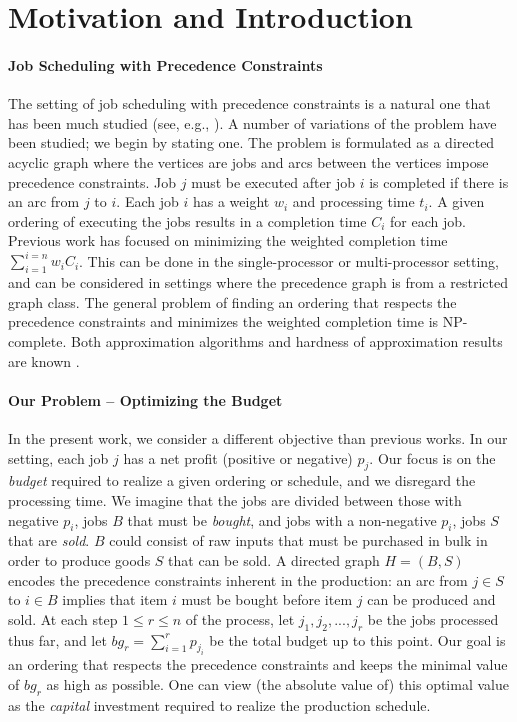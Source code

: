 \documentclass[letterpaper,11pt,abstracton]{scrartcl}
\begin{document}
\section{Motivation and Introduction}\label{sec:intro}

\paragraph{Job Scheduling with Precedence Constraints}
The setting of job scheduling with precedence constraints is a natural
one that has been much studied (see, e.g., \cite{CS05,MMS04}).  A number of
variations of the problem have been studied; we begin by stating one.
The problem is formulated as a directed acyclic graph where
the vertices are jobs and arcs between the vertices impose precedence
constraints.  Job $j$ must be executed after job $i$ is completed if
there is an arc from $j$ to $i$.  Each job $i$ has a weight $w_i$ and
processing time $t_i$.  A given ordering of executing the jobs results
in a completion time $C_i$ for each job.  Previous work has focused on
minimizing the weighted completion time $\sum_{i=1}^{i=n}w_iC_i$.
This can be done in the single-processor or multi-processor setting,
and can be considered in settings where the precedence graph is from
a restricted graph class.  The general problem of finding an ordering that
respects the precedence constraints and minimizes the weighted
completion time is NP-complete.  Both approximation algorithms and
hardness of approximation results are known \cite{AMMS11,AMS07,MMS04,woginger1}.



\paragraph{Our Problem -- Optimizing the Budget}
In the present work, we consider a different objective than previous
works.  In our setting, each job $j$ has a net profit (positive or
negative) $p_j$.  Our focus is on the \emph{budget} required to
realize a given ordering or schedule, and we disregard the processing
time.  We imagine that the jobs are divided between those with negative
$p_i$, jobs $B$ that must be \emph{bought}, and jobs with a non-negative
$p_i$, jobs $S$ that are \emph{sold}.  $B$ could consist of raw inputs
that must be purchased in bulk in order to produce goods $S$ that
can be sold.  A directed graph
$H=(B,S)$ encodes the precedence constraints inherent in the
production: an arc from $j\in S$ to $i\in B$ implies that item $i$
must be bought before item $j$ can be produced and sold.
At each step $1 \le r \le n$ of the process, let $j_1, j_2, ..., j_r$ be the jobs processed
thus far, and let $bg_r = \sum_{i=1}^r p_{j_i}$ be the total budget
up to this point.  Our goal is an ordering that respects the precedence
constraints and keeps the minimal value of $bg_r$ as high as possible.
One can view (the absolute value of) this optimal value as the \emph{capital} investment required
to realize the production schedule.
\end{document}
